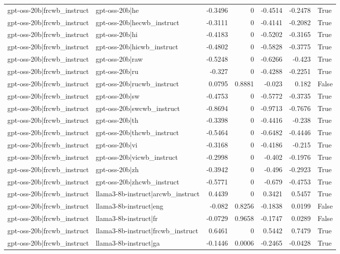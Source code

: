 \begin{table}
\begin{tabular}{l l r r r r l}
gpt-oss-20b|frcwb_instruct & gpt-oss-20b|he & -0.3496 & 0 & -0.4514 & -0.2478 & True \\
gpt-oss-20b|frcwb_instruct & gpt-oss-20b|hecwb_instruct & -0.3111 & 0 & -0.4141 & -0.2082 & True \\
gpt-oss-20b|frcwb_instruct & gpt-oss-20b|hi & -0.4183 & 0 & -0.5202 & -0.3165 & True \\
gpt-oss-20b|frcwb_instruct & gpt-oss-20b|hicwb_instruct & -0.4802 & 0 & -0.5828 & -0.3775 & True \\
gpt-oss-20b|frcwb_instruct & gpt-oss-20b|raw & -0.5248 & 0 & -0.6266 & -0.423 & True \\
gpt-oss-20b|frcwb_instruct & gpt-oss-20b|ru & -0.327 & 0 & -0.4288 & -0.2251 & True \\
gpt-oss-20b|frcwb_instruct & gpt-oss-20b|rucwb_instruct & 0.0795 & 0.8881 & -0.023 & 0.182 & False \\
gpt-oss-20b|frcwb_instruct & gpt-oss-20b|sw & -0.4753 & 0 & -0.5772 & -0.3735 & True \\
gpt-oss-20b|frcwb_instruct & gpt-oss-20b|swcwb_instruct & -0.8694 & 0 & -0.9713 & -0.7676 & True \\
gpt-oss-20b|frcwb_instruct & gpt-oss-20b|th & -0.3398 & 0 & -0.4416 & -0.238 & True \\
gpt-oss-20b|frcwb_instruct & gpt-oss-20b|thcwb_instruct & -0.5464 & 0 & -0.6482 & -0.4446 & True \\
gpt-oss-20b|frcwb_instruct & gpt-oss-20b|vi & -0.3168 & 0 & -0.4186 & -0.215 & True \\
gpt-oss-20b|frcwb_instruct & gpt-oss-20b|vicwb_instruct & -0.2998 & 0 & -0.402 & -0.1976 & True \\
gpt-oss-20b|frcwb_instruct & gpt-oss-20b|zh & -0.3942 & 0 & -0.496 & -0.2923 & True \\
gpt-oss-20b|frcwb_instruct & gpt-oss-20b|zhcwb_instruct & -0.5771 & 0 & -0.679 & -0.4753 & True \\
gpt-oss-20b|frcwb_instruct & llama3-8b-instruct|arcwb_instruct & 0.4439 & 0 & 0.3421 & 0.5457 & True \\
gpt-oss-20b|frcwb_instruct & llama3-8b-instruct|eng & -0.082 & 0.8256 & -0.1838 & 0.0199 & False \\
gpt-oss-20b|frcwb_instruct & llama3-8b-instruct|fr & -0.0729 & 0.9658 & -0.1747 & 0.0289 & False \\
gpt-oss-20b|frcwb_instruct & llama3-8b-instruct|frcwb_instruct & 0.6461 & 0 & 0.5442 & 0.7479 & True \\
gpt-oss-20b|frcwb_instruct & llama3-8b-instruct|ga & -0.1446 & 0.0006 & -0.2465 & -0.0428 & True \\

\end{tabular}
\end{table}
